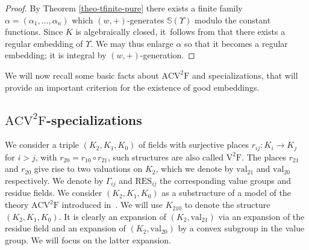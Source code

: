 \documentclass[JEP,XML,SOM,Unicode,ThmDefs,NoEqCountersInSection,published]{cedram}
\newcommand{\val}{\mathrm{val}}
\newcommand{\acvsf}{\mathrm{ACV}^2\mathrm{F}}
\newcommand{\vsf}{\mathrm{V}^2\mathrm{F}}
\newcommand{\RES}{\mathrm{RES}}
\renewcommand{\SS}{\mathbb S}
\theoremstyle{plain}
\theoremstyle{definition}
\begin{document}
\begin{proof}By Theorem \ref{theo-tfinite-pure} there exists
a finite family $\alpha = (\alpha_1, \ldots, \alpha_n)$ which $(w,+)$-generates $\SS(\Upsilon)$ modulo the constant functions. Since $K$ is algebraically closed, it~follows from \cite[Prop.\,6.2.7]{HL}
that there exists a
regular embedding of $\Upsilon$.
We may thus enlarge $\alpha$ so that it becomes a regular embedding; it is integral by $(w,+)$-generation.
\end{proof}

We will now recall some basic facts about $\acvsf$ and specializations, that will provide an important criterion for the existence of good embeddings.

\subsection{$\acvsf$-specializations}\label{sec:specialization}
We consider a triple $(K_2,K_1,K_0)$ of fields with surjective places $r_{ij}: K_i \to K_j$ for $i > j$,
with $r_{20} = r_{10} \circ r_{21}$,
such structures are also called $\vsf$. The places $r_{21}$ and $r_{20}$ give rise to two valuations on $K_2$, which we denote by $\val_{21}$ and $\val_{20}$ respectively.
We denote by $\Gamma_{ij}$ and $\RES_{ij}$ the corresponding value groups and residue fields.
We consider $(K_2,K_1,K_0)$ as a substructure of a model of the theory $\acvsf$ introduced in~\cite[Ch.\,9.3]{HL}. We will use $K_{210}$ to denote the structure $(K_2,K_1,K_0)$. It is clearly an expansion of $(K_2, \val_{21})$ via an expansion of the residue field and an expansion of $(K_2,\val_{20})$ by a convex subgroup in the value group. We will focus on the latter expansion.
\end{document}
